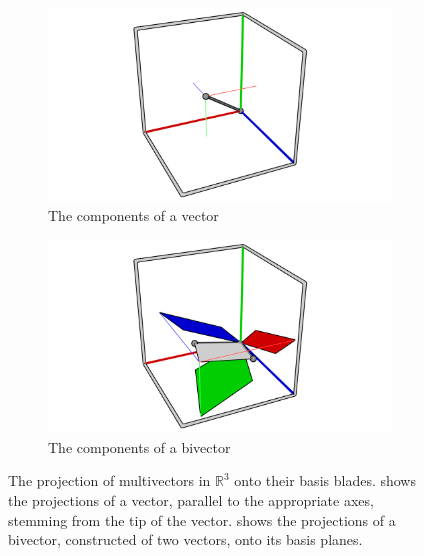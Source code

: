\documentclass{l4proj}
\begin{document}
\begin{figure}
  \begin{subfigure}[b]{0.45\textwidth}
    \includegraphics[width=\textwidth]{images/rotation/projection_vec.png}
    \caption{The components of a vector}
    \label{fig:vec_proj}
  \end{subfigure}
  \begin{subfigure}[b]{0.45\textwidth}
    \includegraphics[width=\textwidth]{images/rotation/projection_biv.png}
    \caption{The components of a bivector}
    \label{fig:bivec_proj}
  \end{subfigure}
  \caption{The projection of multivectors in $\mathbb{R}^3$ onto their basis blades. 
   shows the projections of a vector, parallel to the appropriate axes, stemming from the tip of the vector.
   shows the projections of a bivector, constructed of two vectors, onto its basis planes.}
  \label{fig:projections}
\end{figure}
\end{document}
